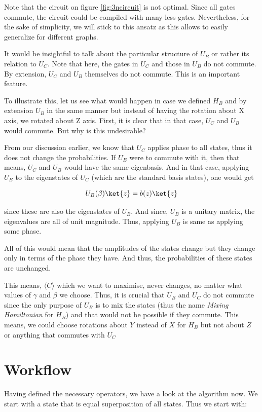 Note that the circuit on figure \ref{fig:3ncircuit} is not optimal. Since all gates commute, the circuit could be compiled with many less gates. Nevertheless, for the sake of simplicity, we will stick to this ansatz as this allows to easily generalize for different graphs.

It would be insightful to talk about the particular structure of $U_B$ or rather its relation to $U_C$.
Note that here, the gates in $U_C$ and those in $U_B$ do not commute.
By extension, $U_C$ and $U_B$ themselves do not commute.
This is an important feature.

To illustrate this, let us see what would happen in case we defined $H_B$ and by extension $U_B$ in the same manner but instead of having the rotation about X axis, we rotated about Z axis.
First, it is clear that in that case, $U_C$ and $U_B$ would commute. But why is this undesirable?

From our discussion earlier, we know that $U_C$ applies phase to all states, thus it does not change the probabilities.
If $U_B$ were to commute with it, then that means, $U_C$ and $U_B$ would have the same eigenbasis.
And in that case, applying $U_B$ to the eigenstates of $U_C$ (which are the standard basis states), one would get

$$U_B(\beta)\ket{z} = b(z)\ket{z}$$

since these are also the eigenstates of $U_B$. And since, $U_B$ is a unitary matrix, the eigenvalues are all of unit magnitude. Thus, applying $U_B$ is same as applying some phase.

All of this would mean that the amplitudes of the states change but they change only in terms of the phase they have.
And thus, the probabilities of these states are unchanged.

This means, $\langle C \rangle$ which we want to maximise, never changes, no matter what values of $\gamma$ and $\beta$ we choose.
Thus, it is crucial that $U_B$ and $U_C$ do not commute since the only purpose of $U_B$ is to mix the states (thus the name \textit{Mixing Hamiltonian} for $H_B$) and that would not be possible if they commute.
This means, we could choose rotations about $Y$ instead of $X$ for $H_B$ but not about $Z$ or anything that commutes with $U_C$ 

\section{Workflow}

Having defined the necessary operators, we have a look at the algorithm now.
We start with a state that is equal superposition of all states. Thus we start with:

